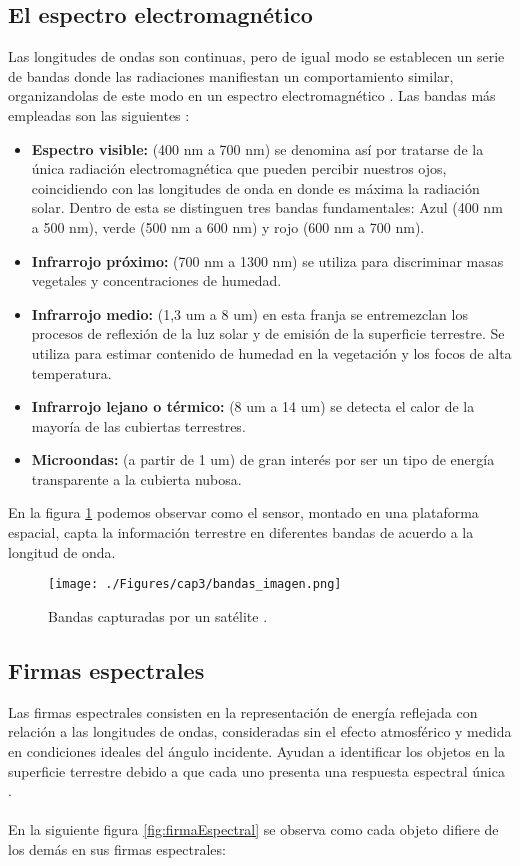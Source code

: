 \subsection{El espectro electromagn\'etico}
Las longitudes de ondas son continuas, pero de igual modo se establecen un serie de bandas donde las radiaciones manifiestan un comportamiento similar, organizandolas de este modo en un espectro electromagn\'etico \cite{remote2010abdulrahman}.
Las bandas m\'as empleadas son las siguientes \cite{salinero2002teledeteccion}:
	\begin{itemize}
		\item \textbf{Espectro visible:} (400 nm a 700 nm) se denomina as\'i por tratarse de la \'unica radiaci\'on electromagn\'etica que pueden percibir nuestros ojos, coincidiendo con las longitudes de onda en donde es m\'axima la radiaci\'on solar. Dentro de esta se distinguen tres bandas fundamentales: Azul (400 nm a 500 nm), verde (500 nm a 600 nm) y rojo (600 nm a 700 nm).
		\item \textbf{Infrarrojo pr\'oximo:} (700 nm a 1300 nm) se utiliza para discriminar masas vegetales y concentraciones de humedad.
		\item \textbf{Infrarrojo medio:} (1,3 um a 8 um) en esta franja se entremezclan los procesos de reflexi\'on de la luz solar y de emisi\'on de la superficie terrestre. Se utiliza para estimar contenido de humedad en la vegetaci\'on y los focos de alta temperatura.
		\item \textbf{Infrarrojo lejano o térmico:} (8 um a 14 um) se detecta el calor de la mayor\'ia de las cubiertas terrestres.
		\item \textbf{Microondas:} (a partir de 1 um) de gran inter\'es por ser un tipo de energ\'ia transparente a la cubierta nubosa.
	\end{itemize}
	En la figura \ref{fig:bandasIs} podemos observar como el sensor, montado en una plataforma espacial, capta la informaci\'on terrestre en diferentes bandas de acuerdo a la longitud de onda.
	\begin{figure}[H]
		\centering
		\texttt{[image: ./Figures/cap3/bandas\_imagen.png]}
		\caption{Bandas capturadas por un sat\'elite \cite{teledet2015perce}.}
		\label{fig:bandasIs}
	\end{figure}

\subsection{Firmas espectrales}
Las firmas espectrales consisten en la representaci\'on de energ\'ia reflejada con relaci\'on a las longitudes de ondas, consideradas sin el efecto atmosf\'erico y medida en condiciones ideales del \'angulo incidente. Ayudan a identificar los objetos en la superficie terrestre debido a que cada uno presenta una respuesta espectral \'unica \cite{sivakumar2004satellite}.\\~\\
En la siguiente figura \ref{fig:firmaEspectral} se observa como cada objeto difiere de los dem\'as en sus firmas espectrales:

